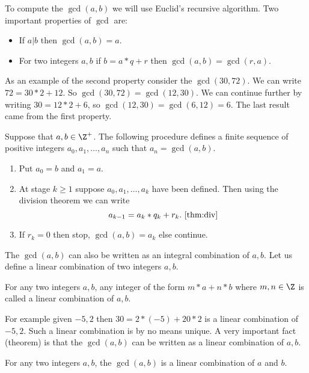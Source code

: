 To compute the $\gcd(a,b)$ we will use Euclid's recursive algorithm. Two important properties of
$\gcd$ are:
\begin{itemize}
    \item If $ a | b$ then $\gcd(a,b) = a$.
    \item For two integers $a,b$ if $b = a*q + r$ then $\gcd(a,b) = \gcd(r,a)$.
\end{itemize}
As an example of the second property consider the $\gcd(30,72)$. We can write $ 72 = 30*2 + 12 $. So
$\gcd(30,72) = \gcd(12,30)$. We can continue further by writing $30 = 12*2 + 6$, so $\gcd(12,30) =
\gcd(6,12) = 6$. The last result came from the first property. 

\begin{Theorem}[name=Euclidean Algorithm]
    Suppose that $a,b \in \Z^{+}$. The following procedure defines a finite sequence of positive
    integers $a_0,a_1,\ldots,a_n$ such that $a_n = \gcd(a,b)$. 
    \begin{enumerate}
	\item Put $a_0 = b$ and $a_1 = a$.
	\item At stage $k \geq 1$ suppose $a_0,a_1,\ldots,a_k$ have been defined. Then using the
	    division theorem we can write
	    \begin{equation*}
		a_{k-1} = a_k*q_k + r_k.~\eqref{thm:div}
	    \end{equation*}
	\item If $r_k = 0$ then stop, $\gcd(a,b) = a_k$ else continue.
    \end{enumerate}
\label{thm:euclid_al}
\end{Theorem}

The $\gcd(a,b)$ can also be written as an integral combination of $a,b$. Let us define a linear
combination of two integers $a,b$.
\begin{Definition}
    For any two integers $a,b$, any integer of the form $m*a + n*b$ where $m,n \in \Z$ is called a
    linear combination of $a,b$.
\end{Definition}
For example given $-5,2$ then $30 = 2*(-5) + 20*2$ is a linear combination of $-5,2$. Such a linear
combination is by no means unique. A very important fact (theorem) is that the $\gcd(a,b)$ can be
written as a linear combination of $a,b$.

\begin{Theorem}[name=gcd as linear combination]
    For any two integers $a,b$, the $\gcd(a,b)$ is a linear combination of $a$ and $b$.
\end{Theorem}

